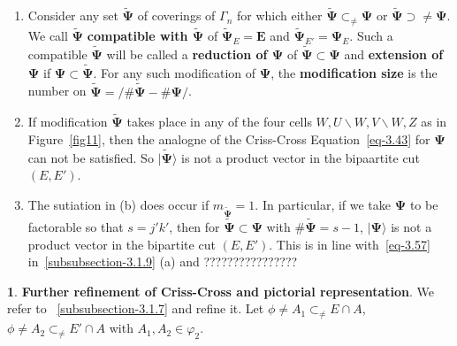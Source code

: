 \documentclass[a4paper,12pt]{article}
\theoremstyle{definition}
\theoremstyle{underlinethm}
\theoremstyle{definition}
\newtheorem{subsubsec}{}[subsection]
\begin{document}
\begin{enumerate}[label =(\alph*)]
\item Consider any set $\boldsymbol{\widetilde{\Psi}}$ of coverings of $\Gamma_{n}$ for which either $\boldsymbol{\widetilde{\Psi}} \subset_{\neq} \boldsymbol{\Psi}$ or $\boldsymbol{\widetilde{\Psi}} \supset\neq \boldsymbol{\Psi}$. We call $\boldsymbol{\widetilde{\Psi}}$ \textbf{compatible with $\boldsymbol{\widetilde{\Psi}}$} of $\boldsymbol{\widetilde{\Psi}}_{E}= \boldsymbol{E}$ and $\boldsymbol{\widetilde{\Psi}}_{E'} = \boldsymbol{\Psi}_{E}$. Such a compatible $\boldsymbol{\widetilde{\Psi}}$ will be called a \textbf{reduction of $\boldsymbol{\Psi}$} of $\boldsymbol{\widetilde{\Psi}} \subset \boldsymbol{\Psi}$ and \textbf{extension of} $\boldsymbol{\Psi}$ if $\boldsymbol{\Psi} \subset \boldsymbol{\widetilde{\Psi}}$. For any such modification of $\boldsymbol{\Psi}$, the \textbf{modification size} is the number on $\boldsymbol{\widetilde{\Psi}} = / \# \boldsymbol{\widetilde{\Psi}} - \# \boldsymbol{\Psi}/$.

\item If modification $\boldsymbol{\widetilde{\Psi}}$ takes place in any of the four cells $W, U \smallsetminus W, V\smallsetminus W, Z$ as in Figure~\ref{fig11}, then the analogne of the Criss-Cross Equation~\eqref{eq-3.43} for $\boldsymbol{\Psi}$ can not be satisfied. So $| \boldsymbol{\widetilde{\Psi}} \rangle$ is not a product vector in the bipaartite cut $(E, E')$.

\item The sutiation in (b) does occur if $m_{\boldsymbol{\widetilde{\Psi}}} =1$. In particular, if we take $\boldsymbol{\Psi}$ to be factorable so that $s=j'k'$, then for $\boldsymbol{\widetilde{\Psi}} \subset \boldsymbol{\Psi}$ with $\# \boldsymbol{\widetilde{\Psi}} = s-1$, $| \boldsymbol{\Psi} \rangle$ is not a product vector in the bipartite cut $(E, E')$. This is in line with~\eqref{eq-3.57} in~\eqref{subsubsection-3.1.9} (a) and ????????????????
\end{enumerate}

\begin{subsubsec}\label{subsubsection-3.1.11}
\textbf{Further refinement of Criss-Cross and pictorial representation}. We refer to ~\eqref{subsubsection-3.1.7} and refine it. Let $\phi\neq A_{1} \subset_{\neq} E \cap A$, $\phi \neq A_{2} \subset_{\neq} E' \cap A$ with $A_{1}, A_{2} \in \varphi_{2}$.
\end{subsubsec}
\end{document}
